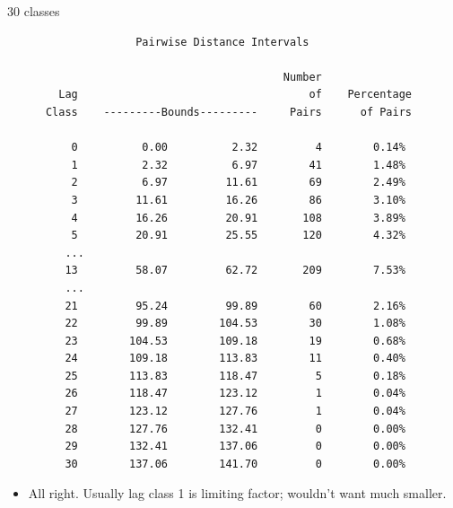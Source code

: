 \begin{frame}[fragile]{30 classes}

{\tiny
\begin{verbatim}
                    Pairwise Distance Intervals

                                           Number
        Lag                                    of    Percentage
      Class    ---------Bounds---------     Pairs      of Pairs

          0          0.00          2.32         4        0.14%
          1          2.32          6.97        41        1.48%
          2          6.97         11.61        69        2.49%
          3         11.61         16.26        86        3.10%
          4         16.26         20.91       108        3.89%
          5         20.91         25.55       120        4.32%
         ...
         13         58.07         62.72       209        7.53%
         ...
         21         95.24         99.89        60        2.16%
         22         99.89        104.53        30        1.08%
         23        104.53        109.18        19        0.68%
         24        109.18        113.83        11        0.40%
         25        113.83        118.47         5        0.18%
         26        118.47        123.12         1        0.04%
         27        123.12        127.76         1        0.04%
         28        127.76        132.41         0        0.00%
         29        132.41        137.06         0        0.00%
         30        137.06        141.70         0        0.00%
\end{verbatim}
}

\begin{itemize}
\item All right. Usually lag class 1 is limiting factor;
  wouldn't want much smaller.
\end{itemize}
  
\end{frame}

